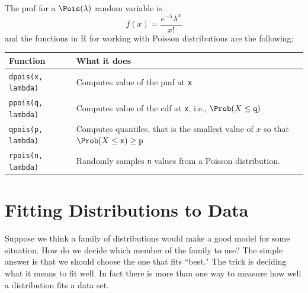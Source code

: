 \documentclass[twoside]{book}\usepackage[]{graphicx}\usepackage[]{xcolor}
\newenvironment{knitrout}{}{} %
\begin{document}
\begin{knitrout}
{}



\end{knitrout}

The pmf for a $\Pois(\lambda)$ random variable is 
\[
f(x) = \frac{ e^{-\lambda} \lambda^x}{x!}
\]
and the functions in R for working with Poisson distributions are 
the following:

\begin{center}
\begin{tabular}{ll}
	\hline
	Function & What it does \\
	\hline
	\texttt{dpois(x, lambda)} & Computes value of the pmf at \texttt{x}
	\\
	\texttt{ppois(q, lambda)} 
		& Computes value of the cdf at \texttt{x}, i.e., 
	$\Prob(X \le \texttt{q})$
	\\
	\texttt{qpois(p, lambda)} 
		& Computes quantiles, that is the smallest value of $x$ so that 
	$\Prob(X \le \texttt{x}) \ge \texttt{p}$
    \\
	\texttt{rpois(n, lambda)} & Randomly samples \texttt{n} values from a
	Poisson distribution.
	\\
	\hline
\end{tabular}
\end{center}



\section{Fitting Distributions to Data}

Suppose we think a family of distributions would make a good model for some 
situation.  How do we decide which member of the family to use?  The simple answer
is that we should choose the one that fits ``best."  The trick is deciding what it 
means to fit well.  In fact there is more than one way to measure how well 
a distribution fits a data set.  
\end{document}
